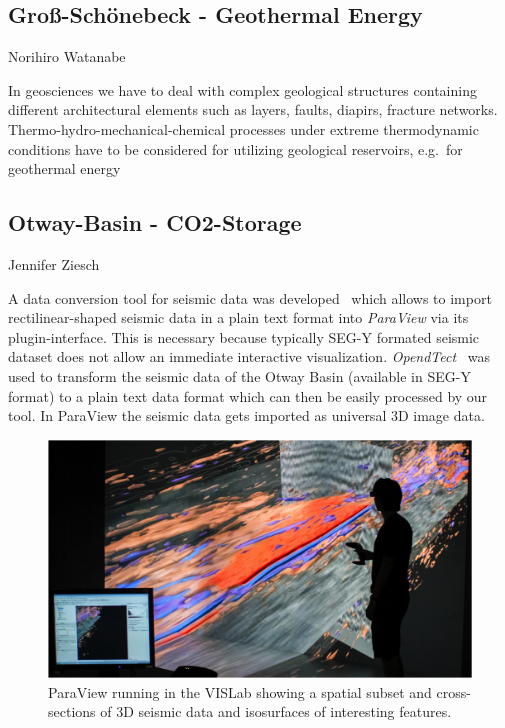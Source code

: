 \documentclass[twocolumn]{svjour3}          %
\begin{document}
\subsection{Gro{\ss}-Sch\"onebeck - Geothermal Energy}
\label{grouss-schoenebeck---geothermal-energy}

Norihiro Watanabe

In geosciences we have to deal with complex geological structures containing different architectural elements such as layers, faults, diapirs, fracture networks. Thermo-hydro-mechanical-chemical processes under extreme thermodynamic conditions have to be considered for utilizing geological reservoirs, e.g.~for geothermal energy~\cite{zehner:uncertainty}

\subsection{Otway-Basin - CO2-Storage}
\label{otway-basin---co2-storage}

Jennifer Ziesch

A data conversion tool for seismic data was developed~\cite{bilke:simpleseismicreader} which allows to import rectilinear-shaped seismic data in a plain text format into \emph{ParaView} via its plugin-interface. This is necessary because typically SEG-Y formated seismic dataset does not allow an immediate interactive visualization. \emph{OpendTect}~\cite{web:opendtect} was used to transform the seismic data of the Otway Basin (available in SEG-Y format) to a plain text data format which can then be easily processed by our tool. In ParaView the seismic data gets imported as universal 3D image data.

\begin{figure}
  \includegraphics[width=\linewidth]{images/seismic.jpg}
\caption{ParaView running in the VISLab showing a spatial subset and cross-sections of 3D seismic data and isosurfaces of interesting features.}
\label{fig:seismic}
\end{figure}
\end{document}
